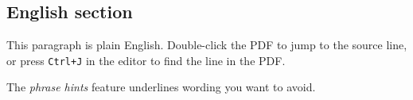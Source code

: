 \begin{latin}
\section{English section}
This paragraph is plain English. Double-click the PDF to jump to the source line,
or press \texttt{Ctrl+J} in the editor to find the line in the PDF.

The \emph{phrase hints} feature underlines wording you want to avoid.
\end{latin}
